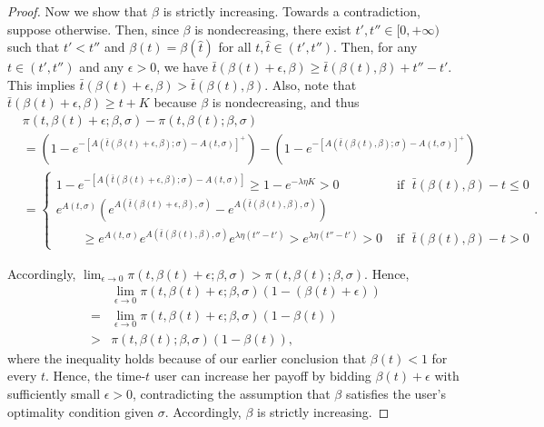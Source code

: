 \documentclass[12pt, letterpaper]{article}
\begin{document}
\begin{proof}
Now we show that $\beta$ is strictly increasing. Towards a contradiction, suppose otherwise. Then, since $\beta$ is nondecreasing, there exist $t', t'' \in [0, + \infty)$ such that $t' < t''$ and $\beta(t) = \beta(\hat{t})$ for all $t, \hat{t} \in (t', t'')$. Then, for any $t \in (t', t'')$ and any $\epsilon > 0$, we have $\bar{t}(\beta(t) + \epsilon, \beta) \ge \bar{t}(\beta(t), \beta) + t'' - t'$. This implies $\bar{t}(\beta(t) + \epsilon, \beta) > \bar{t}(\beta(t), \beta) $.
Also, note that $\bar{t}(\beta(t) + \epsilon, \beta) \geq t+K$ because $\beta$ is nondecreasing, and thus 
\begin{align}
    & \pi(t, \beta(t) + \epsilon; \beta, \sigma)- \pi(t, \beta(t); \beta, \sigma)\\
    &= (1-e^{- [A(\bar{t}(\beta(t) + \epsilon, \beta);\sigma) -A(t,\sigma)]^+})-(1-e^{- [A(\bar{t}(\beta(t), \beta);\sigma) -A(t,\sigma)]^+})\\
    & = \begin{cases} 1-e^{- [A(\bar{t}(\beta(t) + \epsilon, \beta);\sigma) -A(t,\sigma)]}\geq 1-e^{-\lambda \eta K}>0 
    &\text{ if }\;\bar{t}(\beta(t)  , \beta) -t\leq 0\\
    e^{A(t,\sigma)}(e^{A(\bar{t}(\beta(t)+\epsilon,\beta),\sigma)} - e^{A(\bar{t}(\beta(t) , \beta),\sigma)}) \\
    \hspace{2em} \ge e^{A(t,\sigma)}e^{A(\bar{t}(\beta(t) , \beta),\sigma)}e^{\lambda \eta(t''-t')} >e^{\lambda \eta(t''-t')}>0 &
    \text{ if }\;\bar{t}(\beta(t)  , \beta) -t>0
\end{cases}.
\end{align}

 
Accordingly, $\lim_{\epsilon \to 0}\pi(t, \beta(t) + \epsilon; \beta, \sigma) > \pi(t, \beta(t); \beta, \sigma)$. Hence,
\begin{align}
    &\lim_{\epsilon \to 0}\pi(t, \beta(t) + \epsilon; \beta, \sigma)(1 - (\beta(t) + \epsilon))\\
    =& \lim_{\epsilon \to 0}\pi(t, \beta(t) + \epsilon; \beta, \sigma)(1 - \beta(t))\\
    >& \pi(t, \beta(t); \beta, \sigma)(1 - \beta(t)),
\end{align}
where the inequality holds because of our earlier conclusion that $\beta(t)<1$ for every $t$.
Hence, the time-$t$ user can increase her payoff by bidding $\beta(t) + \epsilon$ with sufficiently small $\epsilon > 0$, contradicting the assumption that $\beta$ satisfies the user's optimality condition given $\sigma$. Accordingly, $\beta$ is strictly increasing.




\end{proof}
\end{document}
